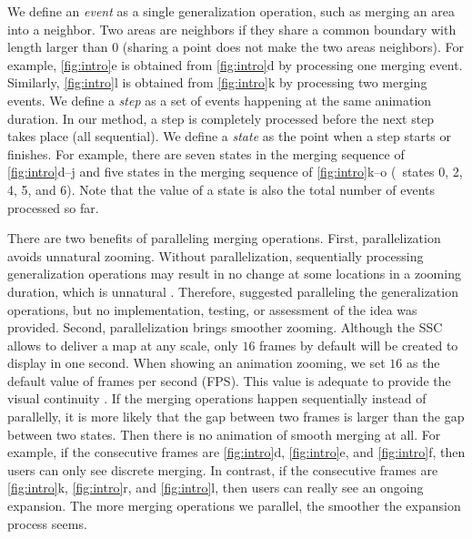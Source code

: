 \documentclass{ica}
\begin{document}
We define an \emph{event} as a single generalization operation, 
such as merging an area into a neighbor.
Two areas are neighbors if they share a common boundary with length larger than 0
(sharing a point does not make the two areas neighbors).
For example, \fig\ref{fig:intro}e is obtained from 
\fig\ref{fig:intro}d by processing one merging event.
Similarly, \fig\ref{fig:intro}l is obtained from 
\fig\ref{fig:intro}k by processing two merging events.
We define a \emph{step} as 
a set of events happening at the same animation duration.
In our method, a step is completely processed 
before the next step takes place (all sequential).
We define a \emph{state} as the point when a step starts or finishes.
For example, there are seven states 
in the merging sequence of \figs\ref{fig:intro}d--j
and five states in the merging sequence of \figs\ref{fig:intro}k--o 
(\ie~states 0, 2, 4, 5, and 6).
Note that the value of a state is also 
the total number of events processed so far.

There are two benefits of paralleling merging operations.
First, parallelization avoids unnatural zooming.
Without parallelization,
sequentially processing generalization operations 
may result in no change at some locations in a zooming duration, 
which is unnatural \citep{vanOosterom2014Support}. 
Therefore, \citet{vanOosterom2014Support} 
suggested paralleling the generalization operations,
but no implementation, testing, or assessment of the idea was provided.
Second, parallelization brings smoother zooming.
Although the SSC allows to deliver a map at any scale,
only $16$ frames by default will be created to display in one second.
When showing an animation zooming, 
we set $16$ as the default value of frames per second (FPS).
This value is adequate to provide the visual continuity
\citep[]{Read2000Film}.
If the merging operations happen sequentially instead of parallelly,
it is more likely that
the gap between two frames is larger than the gap between two states.
Then there is no animation of smooth merging at all.
For example, if the consecutive frames are 
\figs\ref{fig:intro}d, \ref{fig:intro}e, and \ref{fig:intro}f,
then users can only see discrete merging.
In contrast, if the consecutive frames are 
\figs\ref{fig:intro}k, \ref{fig:intro}r, and \ref{fig:intro}l,
then users can really see an ongoing expansion. 
The more merging operations we parallel, 
the smoother the expansion process seems.
\end{document}
